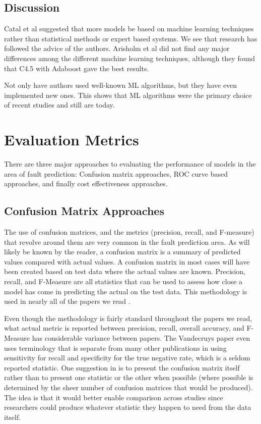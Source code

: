 \documentclass{sig-alternate-05-2015}
\begin{document}
\subsection{Discussion}
Catal et al \cite{Catal} suggested that more models be based on machine learning techniques rather than statistical methods or expert based systems. We see that research has followed the advice of the authors. Arisholm et al \cite{Arisholm} did not find any major differences among the different machine learning techniques, although they found that C4.5 with Adaboost gave the best results. 

Not only have authors used well-known ML algorithms, but they have even implemented new ones. This shows that ML algorithms were the primary choice of recent studies and still are today.

\section{Evaluation Metrics}

There are three major approaches to evaluating the performance of models in the area of fault prediction:  Confusion matrix approaches, ROC curve based approaches, and finally cost effectiveness approaches.

\subsection{Confusion Matrix Approaches}

The use of confusion matrices, and the metrics (precision, recall, and F-measure) that revolve around them are very common in the fault prediction area.  As will likely be known by the reader, a confusion matrix is a summary of predicted values compared with actual values.  A confusion matrix in most cases will have been created based on test data where the actual values are known.  Precision, recall, and F-Measure are all statistics that can be used to assess how close a model has come in predicting the actual on the test data.  This methodology is used in nearly all of the papers we read \cite{Posnett} \cite{Nam} \cite{Bird} \cite{Vandecruys} \cite{Nagappan} \cite{Arisholm} \cite{Rahman} \cite{Jiang}. 

Even though the methodology is fairly standard throughout the papers we read, what actual metric is reported between precision, recall, overall accuracy, and F-Measure has considerable variance between papers.  The Vandecruys paper \cite{Vandecruys} even uses terminology that is separate from many other publications in using sensitivity for recall and specificity for the true negative rate, which is a seldom reported statistic. One suggestion in \cite{Hall} is to present the confusion matrix itself rather than to present one statistic or the other when possible (where possible is determined by the sheer number of confusion matrices that would be produced).  The idea is that it would better enable comparison across studies since researchers could produce whatever statistic they happen to need from the data itself.
\end{document}
